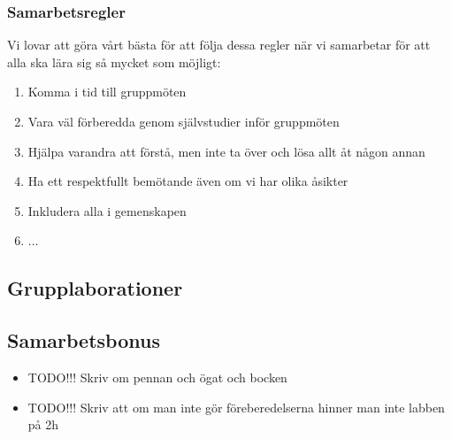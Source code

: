 \begin{tcolorbox}%
\subsubsection*{Samarbetsregler}
Vi lovar att göra vårt bästa för att följa dessa regler när vi samarbetar för att alla ska lära sig så mycket som möjligt: 
\begin{enumerate}
\item Komma i tid till gruppmöten
\item Vara väl förberedda genom självstudier inför gruppmöten
\item Hjälpa varandra att förstå, men inte ta över och lösa allt åt någon annan
\item Ha ett respektfullt bemötande även om vi har olika åsikter
\item Inkludera alla i gemenskapen
\item ...
\end{enumerate}
\end{tcolorbox}
\subsection*{Grupplaborationer}

\subsection*{Samarbetsbonus}



 
\begin{itemize}
\item TODO!!! Skriv om pennan och ögat och bocken
\item TODO!!! Skriv att om man inte gör föreberedelserna hinner man inte labben på 2h
\end{itemize}



